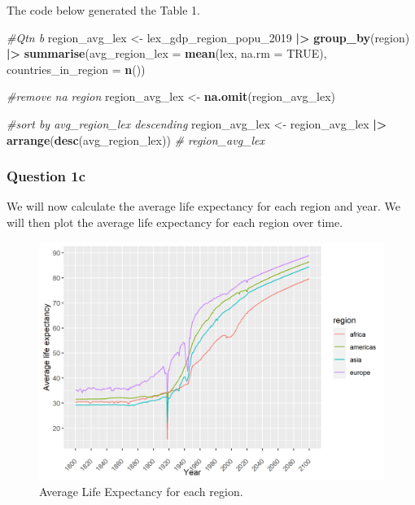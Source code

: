 \documentclass[
]{article}
\newenvironment{Shaded}{\begin{snugshade}}{\end{snugshade}}
\newcommand{\AttributeTok}[1]{\textcolor[rgb]{0.13,0.29,0.53}{#1}}
\newcommand{\CommentTok}[1]{\textcolor[rgb]{0.56,0.35,0.01}{\textit{#1}}}
\newcommand{\ConstantTok}[1]{\textcolor[rgb]{0.56,0.35,0.01}{#1}}
\newcommand{\FunctionTok}[1]{\textcolor[rgb]{0.13,0.29,0.53}{\textbf{#1}}}
\newcommand{\NormalTok}[1]{#1}
\newcommand{\OtherTok}[1]{\textcolor[rgb]{0.56,0.35,0.01}{#1}}
\newcommand{\SpecialCharTok}[1]{\textcolor[rgb]{0.81,0.36,0.00}{\textbf{#1}}}
\begin{document}
The code below generated the Table 1.

\begin{Shaded}
\begin{Highlighting}[]
\CommentTok{\#Qtn b}
\NormalTok{region\_avg\_lex }\OtherTok{\textless{}{-}}\NormalTok{ lex\_gdp\_region\_popu\_2019 }\SpecialCharTok{|\textgreater{}} \FunctionTok{group\_by}\NormalTok{(region) }\SpecialCharTok{|\textgreater{}} \FunctionTok{summarise}\NormalTok{(}\AttributeTok{avg\_region\_lex =} \FunctionTok{mean}\NormalTok{(lex, }\AttributeTok{na.rm =} \ConstantTok{TRUE}\NormalTok{), }\AttributeTok{countries\_in\_region =} \FunctionTok{n}\NormalTok{())}

\CommentTok{\#remove na region}
\NormalTok{region\_avg\_lex }\OtherTok{\textless{}{-}} \FunctionTok{na.omit}\NormalTok{(region\_avg\_lex)}

\CommentTok{\#sort by avg\_region\_lex descending}
\NormalTok{region\_avg\_lex }\OtherTok{\textless{}{-}}\NormalTok{ region\_avg\_lex }\SpecialCharTok{|\textgreater{}} \FunctionTok{arrange}\NormalTok{(}\FunctionTok{desc}\NormalTok{(avg\_region\_lex))}
\CommentTok{\# region\_avg\_lex}
\end{Highlighting}
\end{Shaded}

\hypertarget{question-1c}{%
\subsubsection{Question 1c}\label{question-1c}}

We will now calculate the average life expectancy for each region and
year. We will then plot the average life expectancy for each region over
time.

\begin{figure}
\centering
\includegraphics[width=11.6cm,height=\textheight]{region_avg_lex.png}
\caption{Average Life Expectancy for each region.}
\end{figure}
\end{document}
